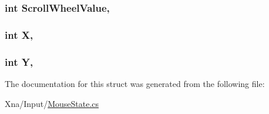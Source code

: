 \subsubsection[{Scroll\+Wheel\+Value}]{\setlength{\rightskip}{0pt plus 5cm}int Scroll\+Wheel\+Value\hspace{0.3cm}{\ttfamily [get]}, {\ttfamily [set]}}\label{structMicrosoft_1_1Xna_1_1Framework_1_1Input_1_1MouseState_a953d824040e6f3cbd8fa95daa201180f}
\hypertarget{structMicrosoft_1_1Xna_1_1Framework_1_1Input_1_1MouseState_a80c0944640e62d3ed6c5419c1bcc0c88}{}
\subsubsection[{X}]{\setlength{\rightskip}{0pt plus 5cm}int X\hspace{0.3cm}{\ttfamily [get]}, {\ttfamily [set]}}\label{structMicrosoft_1_1Xna_1_1Framework_1_1Input_1_1MouseState_a80c0944640e62d3ed6c5419c1bcc0c88}
\hypertarget{structMicrosoft_1_1Xna_1_1Framework_1_1Input_1_1MouseState_aa482c4cc86a24474e4fb19b5b5978778}{}
\subsubsection[{Y}]{\setlength{\rightskip}{0pt plus 5cm}int Y\hspace{0.3cm}{\ttfamily [get]}, {\ttfamily [set]}}\label{structMicrosoft_1_1Xna_1_1Framework_1_1Input_1_1MouseState_aa482c4cc86a24474e4fb19b5b5978778}


The documentation for this struct was generated from the following file\+:\begin{DoxyCompactItemize}
\item 
Xna/\+Input/\hyperlink{MouseState_8cs}{Mouse\+State.\+cs}\end{DoxyCompactItemize}
